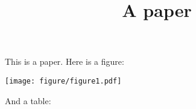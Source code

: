 \documentclass{article}
\title{A paper}
\author{}
\date{}
\begin{document}
\maketitle

This is a paper. Here is a figure:

\begin{center}
\texttt{[image: figure/figure1.pdf]}
\end{center}

And a table:


\end{document}
